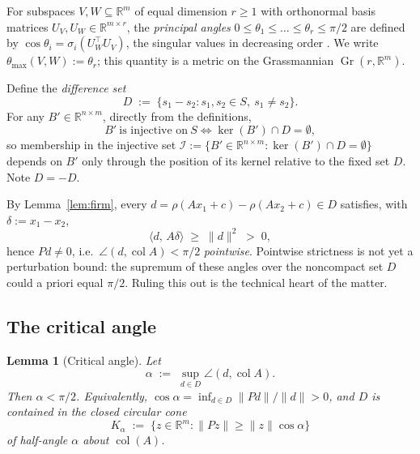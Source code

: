 \documentclass[11pt]{article}
\numberwithin{equation}{section}
\newtheorem{lemma}[theorem]{Lemma}
\theoremstyle{remark}
\newcommand{\R}{\mathbb{R}}
\DeclareMathOperator{\col}{col}
\DeclareMathOperator{\Gr}{Gr}
\newcommand{\norm}[1]{\lVert #1\rVert}
\newcommand{\ip}[2]{\langle #1,\,#2\rangle}
\newcommand{\Kal}{K_{\alpha}}
\begin{document}
For subspaces $V,W\subseteq\R^m$ of equal dimension $r\ge 1$ with orthonormal basis matrices $U_V,U_W\in\R^{m\times r}$, the \emph{principal angles} $0\le\theta_1\le\dots\le\theta_r\le\pi/2$ are defined by $\cos\theta_i=\sigma_i(U_W^{\top}U_V)$, the singular values in decreasing order \cite[\S 6.4.3]{GVL}. We write $\theta_{\max}(V,W):=\theta_r$; this quantity is a metric on the Grassmannian $\Gr(r,\R^m)$.

Define the \emph{difference set}
\[
D\;:=\;\{s_1-s_2 : s_1,s_2\in S,\ s_1\ne s_2\}.
\]
For any $B'\in\R^{n\times m}$, directly from the definitions,
\begin{equation}\label{eq:kernelD}
B'\ \text{is injective on}\ S \iff \ker(B')\cap D=\emptyset ,
\end{equation}
so membership in the injective set $\mathcal I:=\{B'\in\R^{n\times m}: \ker(B')\cap D=\emptyset\}$ depends on $B'$ only through the position of its kernel relative to the fixed set $D$. Note $D=-D$.

By Lemma~\ref{lem:firm}, every $d=\rho(Ax_1+c)-\rho(Ax_2+c)\in D$ satisfies, with $\delta:=x_1-x_2$,
\begin{equation}\label{eq:pointwise}
\ip{d}{A\delta}\;\ge\;\norm{d}^2\;>\;0 ,
\end{equation}
hence $Pd\ne 0$, i.e.\ $\angle(d,\col A)<\pi/2$ \emph{pointwise}. Pointwise strictness is not yet a perturbation bound: the supremum of these angles over the noncompact set $D$ could a priori equal $\pi/2$. Ruling this out is the technical heart of the matter.

\subsection{The critical angle}

\begin{lemma}[Critical angle]\label{lem:critical}
Let
\[
\alpha\;:=\;\sup_{d\in D}\angle(d,\col A).
\]
Then $\alpha<\pi/2$. Equivalently, $\cos\alpha=\inf_{d\in D}\norm{Pd}/\norm{d}>0$, and $D$ is contained in the closed circular cone
\[
\Kal\;:=\;\bigl\{z\in\R^m : \norm{Pz}\ge\norm{z}\cos\alpha\bigr\}
\]
of half-angle $\alpha$ about $\col(A)$.
\end{lemma}
\end{document}
